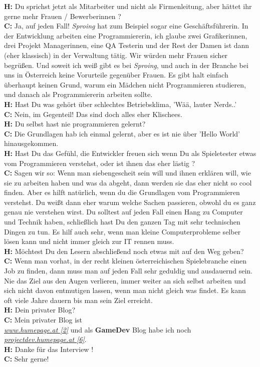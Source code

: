 \documentclass[10pt,a4paper,ngerman,twoside]{article} %
\begin{document}
\textbf{H:} Du sprichst jetzt als Mitarbeiter und nicht als Firmenleitung, aber hättet ihr gerne mehr Frauen / Bewerberinnen ? \\
\textbf{C:} Ja, auf jeden Fall! \textit{Sproing} hat zum Beispiel sogar eine Geschäftsführerin. In der Entwicklung arbeiten eine Programmiererin, ich glaube zwei Grafikerinnen, drei Projekt Managerinnen, eine QA Testerin und der Rest der Damen ist dann (eher klassisch) in der Verwaltung tätig. Wir würden mehr Frauen sicher begrüßen. Und soweit ich weiß gibt es bei \textit{Sproing}, und auch in der Branche bei uns in Österreich keine Vorurteile gegenüber Frauen. Es gibt halt einfach überhaupt keinen Grund, warum ein Mädchen nicht Programmieren studieren, und danach als Programmiererin arbeiten sollte. \\
\textbf{H:} Hast Du was gehört über schlechtes Betriebsklima, 'Wää, lauter Nerds..' \\
\textbf{C:} Nein, im Gegenteil! Das sind doch alles eher Klischees. \\
\textbf{H:} Du selbst hast nie programmieren gelernt? \\
\textbf{C:} Die Grundlagen hab ich einmal gelernt, aber es ist nie über 'Hello World' hinausgekommen. \\
\textbf{H:} Hast Du das Gefühl, die Entwickler freuen sich wenn Du als Spieletester etwas vom Programmieren verstehst, oder ist ihnen das eher lästig ? \\
\textbf{C:} Sagen wir so: Wenn man siebengescheit sein will und ihnen erklären will, wie sie zu arbeiten haben und was da abgeht, dann werden sie das eher nicht so cool finden. Aber es hilft natürlich, wenn du die Grundlagen vom Programmieren verstehst. Du weißt dann eher warum welche Sachen passieren, obwohl du es ganz genau nie verstehen wirst. Du solltest auf jeden Fall einen Hang zu Computer und Technik haben, schließlich hast Du den ganzen Tag mit sehr technischen Dingen zu tun. Es hilf auch sehr, wenn man kleine Computerprobleme selber lösen kann und nicht immer gleich zur IT rennen muss. \\
\textbf{H:} Möchtest Du den Lesern abschließend noch etwas mit auf den Weg geben? \\
\textbf{C:} Wenn man vorhat, in der recht kleinen österreichischen Spielebranche einen Job zu finden, dann muss man auf jeden Fall sehr geduldig und ausdauernd sein. Nie das Ziel aus den Augen verlieren, immer weiter an sich selbst arbeiten und sich nicht davon entmutigen lassen, wenn man nicht gleich was findet. Es kann oft viele Jahre dauern bis man sein Ziel erreicht.  \\
\textbf{H:} Dein privater Blog? \\
\textbf{C:} Mein privater Blog ist \\ \href{http://www.humepage.at}{\textit{www.humepage.at [2]}}
und als \textbf{GameDev} Blog habe ich noch \\ \href{http://projectdev.humepage.at/}{\textit{projectdev.humepage.at [6]}}. \\
\textbf{H:} Danke für das Interview ! \\
\textbf{C:} Sehr gerne! \\
\end{document}
